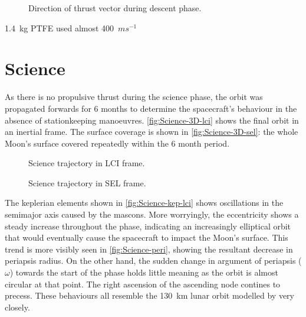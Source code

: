 \begin{figure}
\centering
\def\svgwidth{\figurewidth}

\caption{Direction of thrust vector during descent phase.}
\label{fig:Descent-thrust}
\end{figure}

1.4~kg PTFE used
almost 400~$ms^{-1}$

\clearpage

\section{Science} \label{sec:Science}

As there is no propulsive thrust during the science phase, the orbit was propagated forwards for 6 months to determine the spacecraft's behaviour in the absence of stationkeeping manoeuvres. \autoref{fig:Science-3D-lci} shows the final orbit in an inertial frame. The surface coverage is shown in \autoref{fig:Science-3D-sel}: the whole Moon's surface covered repeatedly within the 6 month period. 

\begin{figure}
\centering
\def\svgwidth{\figurewidth}

\caption{Science trajectory in LCI frame.}
\label{fig:Science-3D-lci}
\end{figure}

\begin{figure}
\centering
\def\svgwidth{\figurewidth}

\caption{Science trajectory in SEL frame.}
\label{fig:Science-3D-sel}
\end{figure}

The keplerian elements shown in \autoref{fig:Science-kep-lci} shows oscillations in the semimajor axis caused by the mascons. More worryingly, the eccentricity shows a steady increase throughout the phase, indicating an increasingly elliptical orbit that would eventually cause the spacecraft to impact the Moon's surface. This trend is more visibly seen in \autoref{fig:Science-peri}, showing the resultant decrease in periapsis radius. On the other hand, the sudden change in argument of periapsis ($\omega$) towards the start of the phase holds little meaning as the orbit is almost circular at that point. The right ascension of the ascending node contines to precess. These behaviours all resemble the 130~km lunar orbit modelled by \textcite{Gupta2011} very closely.

